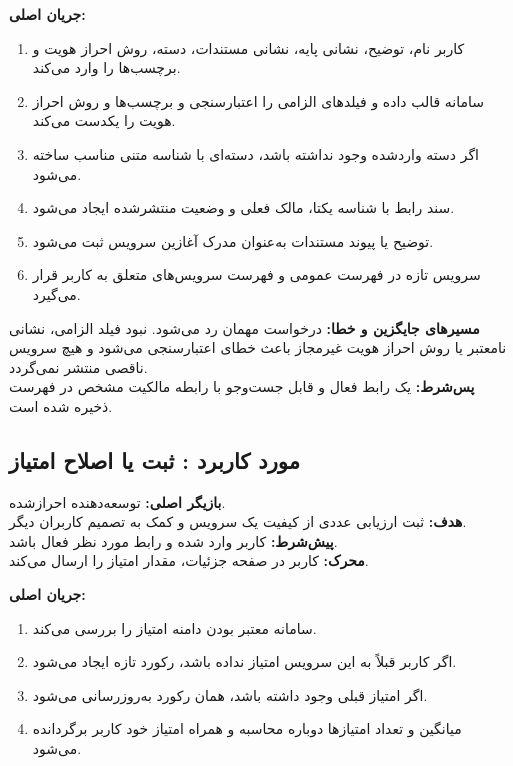 
\noindent\textbf{جریان اصلی:}
\begin{enumerate}
  \item کاربر نام، توضیح، نشانی پایه، نشانی مستندات، دسته، روش احراز هویت و برچسب‌ها را وارد می‌کند.
  \item سامانه قالب داده و فیلدهای الزامی را اعتبارسنجی و برچسب‌ها و روش احراز هویت را یکدست می‌کند.
  \item اگر دسته واردشده وجود نداشته باشد، دسته‌ای با شناسه متنی مناسب ساخته می‌شود.
  \item سند رابط با شناسه یکتا، مالک فعلی و وضعیت منتشرشده ایجاد می‌شود.
  \item توضیح یا پیوند مستندات به‌عنوان مدرک آغازین سرویس ثبت می‌شود.
  \item سرویس تازه در فهرست عمومی و فهرست سرویس‌های متعلق به کاربر قرار می‌گیرد.
\end{enumerate}

\noindent\textbf{مسیرهای جایگزین و خطا:}
درخواست مهمان رد می‌شود. نبود فیلد الزامی، نشانی نامعتبر یا روش احراز هویت غیرمجاز باعث خطای اعتبارسنجی می‌شود و هیچ سرویس ناقصی منتشر نمی‌گردد.\\
\textbf{پس‌شرط:} یک رابط فعال و قابل جست‌وجو با رابطه مالکیت مشخص در فهرست ذخیره شده است.

\UseCaseStart
\subsection{مورد کاربرد : ثبت یا اصلاح امتیاز}
\noindent\textbf{بازیگر اصلی:} توسعه‌دهنده احرازشده.\\
\textbf{هدف:} ثبت ارزیابی عددی از کیفیت یک سرویس و کمک به تصمیم کاربران دیگر.\\
\textbf{پیش‌شرط:} کاربر وارد شده و رابط مورد نظر فعال باشد.\\
\textbf{محرک:} کاربر در صفحه جزئیات، مقدار امتیاز را ارسال می‌کند.


\noindent\textbf{جریان اصلی:}
\begin{enumerate}
  \item سامانه معتبر بودن دامنه امتیاز را بررسی می‌کند.
  \item اگر کاربر قبلاً به این سرویس امتیاز نداده باشد، رکورد تازه ایجاد می‌شود.
  \item اگر امتیاز قبلی وجود داشته باشد، همان رکورد به‌روزرسانی می‌شود.
  \item میانگین و تعداد امتیازها دوباره محاسبه و همراه امتیاز خود کاربر برگردانده می‌شود.
\end{enumerate}

